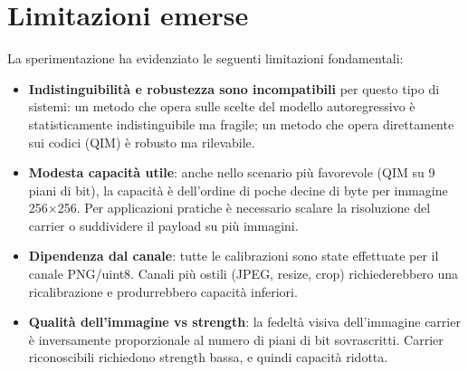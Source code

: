 \section{Limitazioni emerse}

La sperimentazione ha evidenziato le seguenti limitazioni fondamentali:

\begin{itemize}
	\item \textbf{Indistinguibilità e robustezza sono incompatibili} per questo tipo di sistemi: un metodo che opera sulle scelte del modello autoregressivo è statisticamente indistinguibile ma fragile; un metodo che opera direttamente sui codici (QIM) è robusto ma rilevabile.

	\item \textbf{Modesta capacità utile}: anche nello scenario più favorevole (QIM su 9 piani di bit), la capacità è dell'ordine di poche decine di byte per immagine 256$\times$256. Per applicazioni pratiche è necessario scalare la risoluzione del carrier o suddividere il payload su più immagini.

	\item \textbf{Dipendenza dal canale}: tutte le calibrazioni sono state effettuate per il canale PNG/uint8. Canali più ostili (JPEG, resize, crop) richiederebbero una ricalibrazione e produrrebbero capacità inferiori.

	\item \textbf{Qualità dell'immagine vs strength}: la fedeltà visiva dell'immagine carrier è inversamente proporzionale al numero di piani di bit sovrascritti. Carrier riconoscibili richiedono strength bassa, e quindi capacità ridotta.
\end{itemize}